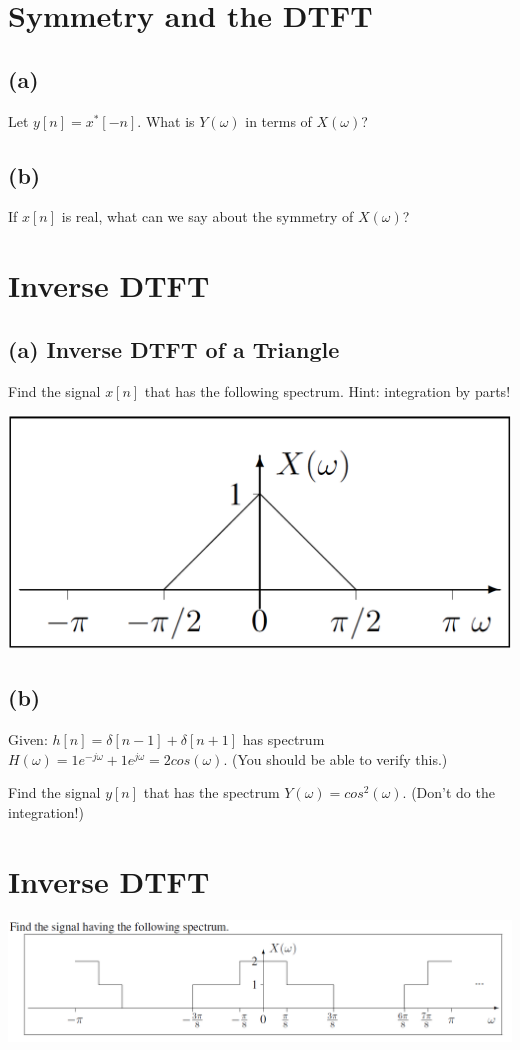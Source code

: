 \documentclass[11pt]{article}
\begin{document}
\section{Symmetry and the DTFT}
\subsection*{(a)}

Let $y[n] = x^*[-n]$. What is $Y(\omega)$ in terms of $X(\omega)$?

\subsection*{(b)}

If $x[n]$ is real, what can we say about the symmetry of $X(\omega)$?

\section{Inverse DTFT}
\subsection*{(a) Inverse DTFT of a Triangle}
Find the signal $x[n]$ that has the following spectrum. Hint: integration by parts!

\includegraphics[scale=0.25]{fessler_hmwk6_p1.png}

\subsection*{(b)}
Given: $h[n] = \delta[n-1]+\delta[n+1]$ has spectrum $H(\omega) = 1 e^{-j\omega}+1e^{j\omega}=2cos(\omega)$. (You should be able to verify this.)

Find the signal $y[n]$ that has the spectrum $Y(\omega)=cos^2(\omega)$. (Don't do the integration!)


\section{Inverse DTFT}
\includegraphics[width = \textwidth]{fessler_hmwk5_p9.png}
\end{document}
